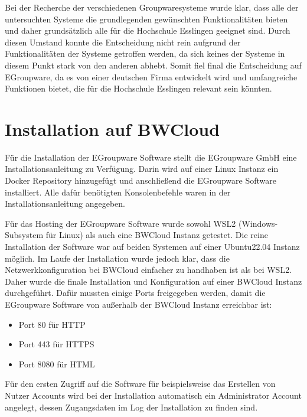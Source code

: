 Bei der Recherche der verschiedenen Groupwaresysteme wurde klar, dass alle der untersuchten Systeme die grundlegenden gewünschten Funktionalitäten bieten und daher grundsätzlich alle für die Hochschule Esslingen geeignet sind.
Durch diesen Umstand konnte die Entscheidung nicht rein aufgrund der Funktionalitäten der Systeme getroffen werden, da sich keines der Systeme in diesem Punkt stark von den anderen abhebt.
Somit fiel final die Entscheidung auf EGroupware, da es von einer deutschen Firma entwickelt wird und umfangreiche Funktionen bietet, die für die Hochschule Esslingen relevant sein könnten.




\section{Installation auf BWCloud}

Für die Installation der EGroupware Software stellt die EGroupware GmbH eine Installationsanleitung zu Verfügung.
Darin wird auf einer Linux Instanz ein Docker Repository hinzugefügt und anschließend die EGroupware Software installiert.
Alle dafür benötigten Konsolenbefehle waren in der Installationsanleitung angegeben. \autocite{egroupware-installation}

Für das Hosting der EGroupware Software wurde sowohl WSL2 (Windows-Subsystem für Linux) als auch eine BWCloud Instanz getestet.
Die reine Installation der Software war auf beiden Systemen auf einer Ubuntu22.04 Instanz möglich.
Im Laufe der Installation wurde jedoch klar, dass die Netzwerkkonfiguration bei BWCloud einfacher zu handhaben ist als bei WSL2.
Daher wurde die finale Installation und Konfiguration auf einer BWCloud Instanz durchgeführt.
Dafür mussten einige Ports freigegeben werden, damit die EGroupware Software von außerhalb der BWCloud Instanz erreichbar ist:
\begin{itemize}
    \item Port 80 für HTTP
    \item Port 443 für HTTPS
    \item Port 8080 für HTML
\end{itemize}

Für den ersten Zugriff auf die Software für beispielsweise das Erstellen von Nutzer Accounts wird bei der Installation automatisch ein Administrator Account angelegt, dessen Zugangsdaten im Log der Installation zu finden sind.